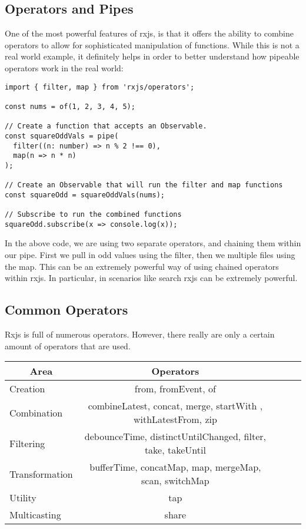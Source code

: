 \subsection{ Operators and Pipes }
One of the most powerful features of rxjs, is that it offers the ability to 
combine operators to allow for sophisticated manipulation of functions. While 
this is not a real world example, it definitely helps in order to better 
understand how pipeable operators work in the real world: 
\begin{lstlisting}
import { filter, map } from 'rxjs/operators';

const nums = of(1, 2, 3, 4, 5);
  
// Create a function that accepts an Observable.
const squareOddVals = pipe(
  filter((n: number) => n % 2 !== 0),
  map(n => n * n)
);  

// Create an Observable that will run the filter and map functions
const squareOdd = squareOddVals(nums);
 
// Subscribe to run the combined functions
squareOdd.subscribe(x => console.log(x));
\end{lstlisting}

In the above code, we are using two separate operators, and chaining them 
within our pipe. First we pull in odd values using the filter, then we 
multiple files using the map. This can be an extremely powerful way of 
using chained operators within rxjs. In particular, in scenarios like search
rxjs can be extremely powerful. 

\subsection{ Common Operators }
Rxjs is full of numerous operators. However, there really are only a certain
amount of operators that are used. 
\begin{center}
  \begin{tabular}{@{} l *4c @{}}
    \toprule
    \multicolumn{1}{c}{\color{red}Area} & Operators \\
    \midrule
    Creation       & from, fromEvent, of \\
    Combination    & combineLatest, concat, merge, startWith , withLatestFrom, zip \\
    Filtering      & debounceTime, distinctUntilChanged, filter, take, takeUntil \\
    Transformation & bufferTime, concatMap, map, mergeMap, scan, switchMap \\
    Utility        & tap \\
    Multicasting   & share \\
  \end{tabular}
\end{center}  

